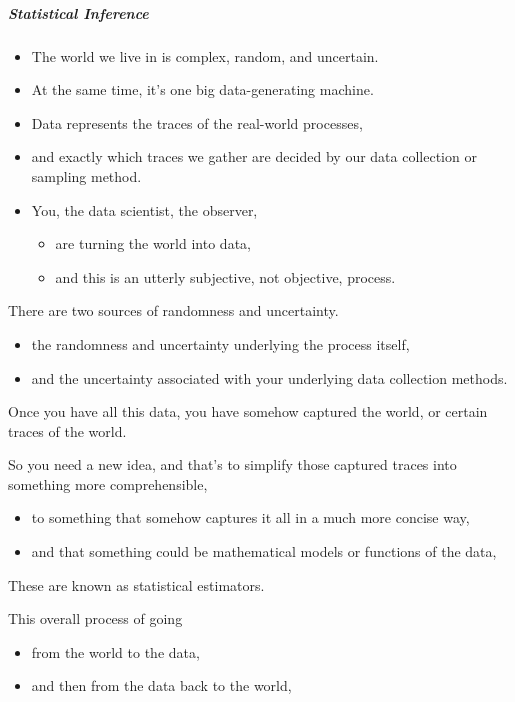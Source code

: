 \documentclass[]{article}
\providecommand{\tightlist}{%
  \setlength{\itemsep}{0pt}\setlength{\parskip}{0pt}}
\let\oldsubparagraph\subparagraph
\renewcommand{\subparagraph}[1]{\oldsubparagraph{#1}\mbox{}}
\begin{document}
\subparagraph{Statistical Inference}\label{statistical-inference}

\begin{itemize}
\tightlist
\item
  The world we live in is complex, random, and uncertain.
\item
  At the same time, it's one big data-generating machine.
\item
  Data represents the traces of the real-world processes,
\item
  and exactly which traces we gather are decided by our data collection
  or sampling method.
\item
  You, the data scientist, the observer,

  \begin{itemize}
  \tightlist
  \item
    are turning the world into data,
  \item
    and this is an utterly subjective, not objective, process.
  \end{itemize}
\end{itemize}

There are two sources of randomness and uncertainty.

\begin{itemize}
\tightlist
\item
  the randomness and uncertainty underlying the process itself,
\item
  and the uncertainty associated with your underlying data collection
  methods.
\end{itemize}

Once you have all this data, you have somehow captured the world, or
certain traces of the world.

So you need a new idea, and that's to simplify those captured traces
into something more comprehensible,

\begin{itemize}
\tightlist
\item
  to something that somehow captures it all in a much more concise way,
\item
  and that something could be mathematical models or functions of the
  data,
\end{itemize}

These are known as statistical estimators.

This overall process of going

\begin{itemize}
\tightlist
\item
  from the world to the data,
\item
  and then from the data back to the world,
\end{itemize}
\end{document}
